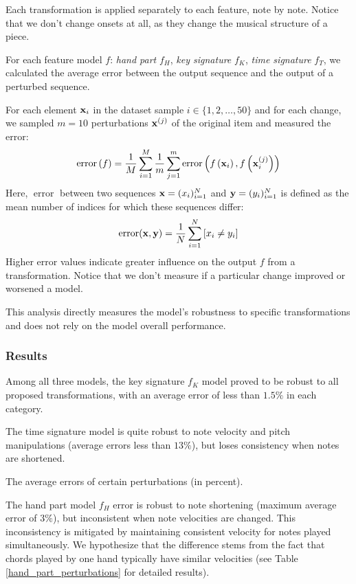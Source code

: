 Each transformation is applied separately to each feature, note by note. Notice that we don't change onsets at all, as they change the musical structure of a piece.

For each feature model $f$: \emph{hand part} $f_H$, \emph{key signature} $f_K$, \emph{time signature} $f_T$, we calculated the average error between the output sequence and the output of a perturbed sequence.

For each element ${\bf x}_i$ in the dataset sample $i\in\{1,2,\ldots,50\}$ and for each change, we sampled $m=10$ perturbations ${\bf x}^{(j)}$ of the original item and measured the error: \[\operatorname{error}\left(f\right) = \frac{1}{M}\sum_{i=1}^{M}\frac{1}{m}\sum_{j=1}^{m}\operatorname{error}\left(f\left({\bf x}_i\right), f\left({\bf x}_i^{(j)}\right)\right)\] Here, $\operatorname{error}$ between two sequences ${\bf x} = (x_i)_{i=1}^N$ and ${\bf y} = (y_i)_{i=1}^N$ is defined as the mean number of indices for which these sequences differ: \[\operatorname{error}({\bf x},{\bf y}) = \frac{1}{N}\sum_{i=1}^N \left[x_i \neq y_i\right]\] Higher error values indicate greater influence on the output $f$ from a transformation. Notice that we don't measure if a particular change improved or worsened a model.

This analysis directly measures the model's robustness to specific transformations and does not rely on the model overall performance.

\subsubsection{Results} \label{results}

Among all three models, the key signature $f_K$ model proved to be robust to all proposed transformations, with an average error of less than $1.5\%$ in each category.

The time signature model is quite robust to note velocity and pitch manipulations (average errors less than $13\%$), but loses consistency when notes are shortened. \begin{table}[ht!]

\caption[The average errors of certain perturbations (in percent).]{The average errors of certain perturbations (in percent).}
\label{perturbations}
\end{table}

The hand part model $f_H$ error is robust to note shortening (maximum average error of $3\%$), but inconsistent when note velocities are changed. This inconsistency is mitigated by maintaining consistent velocity for notes played simultaneously. We hypothesize that the difference stems from the fact that chords played by one hand typically have similar velocities (see Table \ref{hand_part_perturbations} for detailed results).

